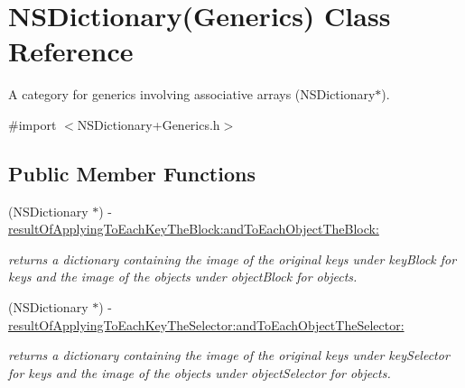 \hypertarget{interface_n_s_dictionary_07_generics_08}{\section{N\-S\-Dictionary(Generics) Class Reference}
\label{interface_n_s_dictionary_07_generics_08}
}


A category for generics involving associative arrays (N\-S\-Dictionary$\ast$).  




{\ttfamily \#import $<$N\-S\-Dictionary+\-Generics.\-h$>$}

\subsection*{Public Member Functions}
\begin{DoxyCompactItemize}
\item 
\hypertarget{interface_n_s_dictionary_07_generics_08_aeb3ac0f540f627534f01600e5dd714ca}{(N\-S\-Dictionary $\ast$) -\/ \hyperlink{interface_n_s_dictionary_07_generics_08_aeb3ac0f540f627534f01600e5dd714ca}{result\-Of\-Applying\-To\-Each\-Key\-The\-Block\-:and\-To\-Each\-Object\-The\-Block\-:}}\label{interface_n_s_dictionary_07_generics_08_aeb3ac0f540f627534f01600e5dd714ca}

\begin{DoxyCompactList}\small\item\em returns a dictionary containing the image of the original keys under key\-Block for keys and the image of the objects under object\-Block for objects. \end{DoxyCompactList}\item 
\hypertarget{interface_n_s_dictionary_07_generics_08_a24e2bc71757abeb903c00cc08d83b720}{(N\-S\-Dictionary $\ast$) -\/ \hyperlink{interface_n_s_dictionary_07_generics_08_a24e2bc71757abeb903c00cc08d83b720}{result\-Of\-Applying\-To\-Each\-Key\-The\-Selector\-:and\-To\-Each\-Object\-The\-Selector\-:}}\label{interface_n_s_dictionary_07_generics_08_a24e2bc71757abeb903c00cc08d83b720}

\begin{DoxyCompactList}\small\item\em returns a dictionary containing the image of the original keys under key\-Selector for keys and the image of the objects under object\-Selector for objects. \end{DoxyCompactList}\end{DoxyCompactItemize}
